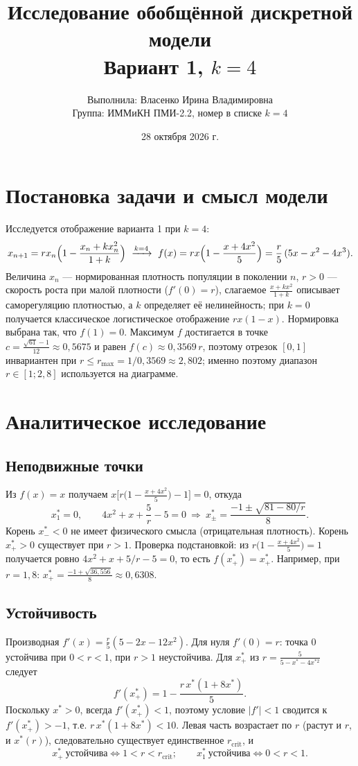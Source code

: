 \documentclass[12pt,a4paper]{article}
\title{Исследование обобщённой дискретной модели\\Вариант 1, $k=4$}
\author{Выполнила: Власенко Ирина Владимировна\\Группа: ИММиКН ПМИ-2.2, номер в списке $k=4$}
\date{28 октября 2026 г.}
\newcommand{\rc}{r_{\mathrm{crit}}}
\begin{document}
\maketitle\tableofcontents\newpage

\section{Постановка задачи и смысл модели}
Исследуется отображение варианта 1 при $k=4$:
\begin{equation}x_{n+1}=r x_n\Bigl(1-\frac{x_n+kx_n^2}{1+k}\Bigr)\ \xrightarrow{k=4}\ f(x)=r x\Bigl(1-\frac{x+4x^2}{5}\Bigr)=\frac r5\,(5x-x^2-4x^3).\label{eq:f}\end{equation}
Величина $x_n$ --- нормированная плотность популяции в поколении $n$, $r>0$ --- скорость роста при малой плотности ($f'(0)=r$), слагаемое $\frac{x+kx^2}{1+k}$ описывает саморегуляцию плотностью, а $k$ определяет её нелинейность; при $k=0$ получается классическое логистическое отображение $rx(1-x)$. Нормировка выбрана так, что $f(1)=0$. Максимум $f$ достигается в точке $c=\frac{\sqrt{61}-1}{12}\approx0{,}5675$ и равен $f(c)\approx0{,}3569\,r$, поэтому отрезок $[0,1]$ инвариантен при $r\le r_{\max}=1/0{,}3569\approx2{,}802$; именно поэтому диапазон $r\in[1;2{,}8]$ используется на диаграмме.

\section{Аналитическое исследование}
\subsection{Неподвижные точки}
Из $f(x)=x$ получаем $x\bigl[r\bigl(1-\frac{x+4x^2}{5}\bigr)-1\bigr]=0$, откуда
\begin{equation}x_1^*=0,\qquad 4x^2+x+\frac5r-5=0\ \Rightarrow\ x^*_\pm=\frac{-1\pm\sqrt{81-80/r}}{8}.\label{eq:fix}\end{equation}
Корень $x^*_-<0$ не имеет физического смысла (отрицательная плотность). Корень $x^*_+>0$ существует при $r>1$. Проверка подстановкой: из $r\bigl(1-\frac{x+4x^2}5\bigr)=1$ получается ровно $4x^2+x+5/r-5=0$, то есть $f(x^*_+)=x^*_+$. Например, при $r=1{,}8$: $x^*_+=\frac{-1+\sqrt{36{,}556}}8\approx0{,}6308$.

\subsection{Устойчивость}
Производная $f'(x)=\frac r5(5-2x-12x^2)$. Для нуля $f'(0)=r$: точка $0$ устойчива при $0<r<1$, при $r>1$ неустойчива. Для $x^*_+$ из $r=\frac5{5-x^*-4x^{*2}}$ следует
\begin{equation}f'(x^*_+)=1-\frac{r\,x^*(1+8x^*)}{5}.\label{eq:fp}\end{equation}
Поскольку $x^*>0$, всегда $f'(x^*_+)<1$, поэтому условие $|f'|<1$ сводится к $f'(x^*_+)>-1$, т.е. $r\,x^*(1+8x^*)<10$. Левая часть возрастает по $r$ (растут и $r$, и $x^*(r)$), следовательно существует единственное $\rc$, и
\begin{equation}x^*_+\ \text{устойчива}\iff 1<r<\rc;\qquad x_1^*\ \text{устойчива}\iff0<r<1.\label{eq:stab}\end{equation}
\end{document}
